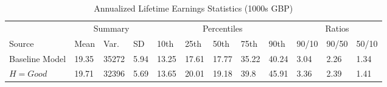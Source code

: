 \documentclass[border=3mm,preview]{standalone}\usepackage{booktabs}
\begin{document}
\begin{landscape}
\small
\begin{table} 
\center\caption*{Annualized Lifetime Earnings Statistics (1000s GBP)} 
\begin{tabular}{l | l l l | l l l l l | l l l} 
\toprule 
 & \multicolumn{3}{c}{Summary} & \multicolumn{5}{c}{Percentiles} & \multicolumn{3}{c}{Ratios} \\ 
Source & Mean & Var. & SD & 10th & 25th & 50th & 75th & 90th & 90/10 & 90/50 & 50/10 \\ 
\midrule 
Baseline Model & 19.35 & 35272 & 5.94 & 
        13.25 & 17.61 & 17.77 & 35.22 & 40.24 &
        3.04 & 2.26 & 1.34 \\ 
$H = Good$ & 19.71 & 32396 & 5.69 & 
        13.65 & 20.01 & 19.18 & 39.8 & 45.91 &
        3.36 & 2.39 
        & 1.41 \\ 
\bottomrule 
\end{tabular}
\end{table}
\end{landscape}
\end{document}
